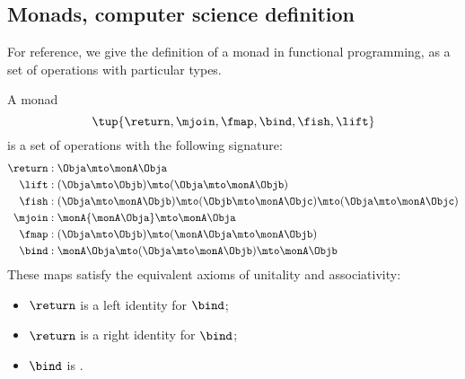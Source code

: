 
\subsection{Monads, computer science definition}
\label{sec:monads-CS}
For reference, we give the definition of a monad in functional programming,
as a set of operations with particular types.

\begin{definition}
    \label{def:monad-computer-science}
    A monad \begin{equation}
        \tup{\return,\mjoin,\fmap,\bind,\fish,\lift}
    \end{equation}
    is a set of operations with the following signature:
    \begin{align}
        \return & :\Obja\mto\monA \Obja \\
        \lift   & :(\Obja\mto \Objb)\mto( \Obja\mto\monA \Objb) \\
        \fish   & :(\Obja\mto\monA \Objb)\mto(\Objb\mto\monA \Objc)\mto(\Obja\mto\monA \Objc) \\
        \mjoin  & :\monA{\monA \Obja}\mto\monA \Obja \\
        \fmap   & :(\Obja\mto \Objb)\mto(\monA \Obja\mto\monA \Objb) \\
        \bind   & :\monA \Obja\mto(\Obja\mto\monA \Objb)\mto\monA \Objb
    \end{align}
    These maps satisfy the equivalent axioms of unitality and associativity:
    \begin{itemize}
        \item $\return$ is a left identity for $\bind$;
        \item $\return$ is a right identity for $\bind$;
        \item $\bind$ is .
    \end{itemize}
\end{definition}

